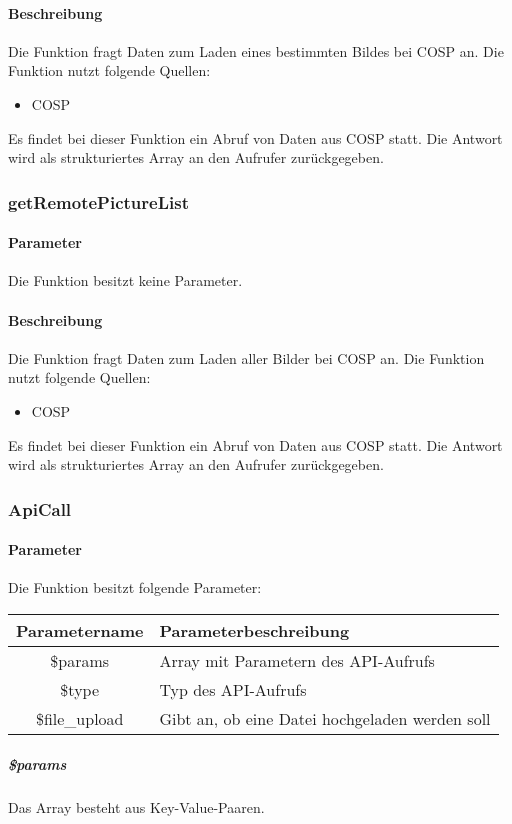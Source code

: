 \paragraph{Beschreibung} Die Funktion fragt Daten zum Laden eines bestimmten Bildes bei {\glqq COSP\grqq} an. Die Funktion nutzt folgende Quellen:
\begin{itemize}
	\item COSP
\end{itemize}
Es findet bei dieser Funktion ein Abruf von Daten aus {\glqq COSP\grqq} statt. Die Antwort wird als strukturiertes Array an den Aufrufer zurückgegeben.
\subsubsection{getRemotePictureList}
\paragraph{Parameter} Die Funktion besitzt keine Parameter.
\paragraph{Beschreibung} Die Funktion fragt Daten zum Laden aller Bilder bei {\glqq COSP\grqq} an. Die Funktion nutzt folgende Quellen:
\begin{itemize}
	\item COSP
\end{itemize}
Es findet bei dieser Funktion ein Abruf von Daten aus {\glqq COSP\grqq} statt. Die Antwort wird als strukturiertes Array an den Aufrufer zurückgegeben.
\subsubsection{ApiCall}
\paragraph{Parameter} Die Funktion besitzt folgende Parameter:
\begin{table}[H]
	\begin{tabular}{|c|p{11cm}|}
		\hline
		\textbf{Parametername} & \textbf{Parameterbeschreibung} \\ \hline
		\$params       & Array mit Parametern des API-Aufrufs \\ \hline
		\$type         & Typ des API-Aufrufs \\ \hline
		\$file\_upload & Gibt an, ob eine Datei hochgeladen werden soll \\ \hline
	\end{tabular}
\end{table}
\subparagraph{\$params}Das Array besteht aus Key-Value-Paaren.
